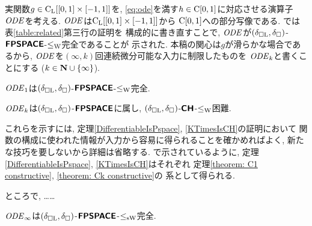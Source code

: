 実関数$g \in \mathrm C _{\mathrm L} [[0, 1] \times [-1, 1]]$を, 
\eqref{eq:ode}を満す$h \in \mathrm C [0, 1]$に対応させる演算子$\mathit{ODE}$を考える. 
$\mathit{ODE}$は$\mathrm C _{\mathrm L} [[0, 1] \times [-1, 1]]$から
$\mathrm C [0, 1]$への部分写像である. 
\cite{kawamura2010operators}では表\ref{table:related}第三行の証明を
構成的に書き直すことで, 
$\mathit{ODE}$が$(\delta _{\square \mathrm L}, \delta _\square)$-$\text{\bfseries \sffamily \upshape FPSPACE}$-$\leq _{\mathrm W}$完全であることが
示された. 
本稿の関心は$g$が滑らかな場合であるから, 
$\mathit{ODE}$を$(\infty, k)$回連続微分可能な入力に制限したものを
$\mathit{ODE} _k$と書くことにする ($k \in \mathbf N \cup \{\infty\}$). 

\begin{theorem}
\label{theorem: C1 constructive}
$\mathit{ODE} _1$は$(\delta _{\square \mathrm L}, \delta _\square)$-$\text{\bfseries \sffamily \upshape FPSPACE}$-$\leq _{\mathrm W}$完全. 
\end{theorem}

\begin{theorem}
\label{theorem: Ck constructive}
$\mathit{ODE} _k$は$(\delta _{\square \mathrm L}, \delta _\square)$-$\text{\bfseries \sffamily \upshape FPSPACE}$に属し, 
$(\delta _{\square \mathrm L}, \delta _\square)$-$\text{\bfseries \sffamily \upshape CH}$-$\leq _{\mathrm W}$困難. 
\end{theorem}

これらを示すには, 
定理\ref{DifferentiableIsPspace}, \ref{KTimesIsCH}の証明において
関数の構成に使われた情報が入力から容易に得られることを確かめればよく, 
新たな技巧を要しないから詳細は省略する. 
\cite{kawamura2010operators}で示されているように, 
定理\ref{DifferentiableIsPspace}, \ref{KTimesIsCH}はそれぞれ
定理\ref{theorem: C1 constructive}, \ref{theorem: Ck constructive}の
系として得られる. 

ところで, ……

\begin{theorem}
$\mathit{ODE} _\infty$は$(\delta _{\square \mathrm L}, \delta _\square)$-$\text{\bfseries \sffamily \upshape FPSPACE}$-$\leq _{\mathrm{sW}}$完全. 
\end{theorem}

